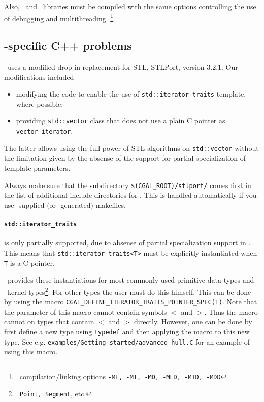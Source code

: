 Also, \leda\ and \cgal\ libraries must be compiled with the same
options controlling the use of debugging and multithreading.
\footnote{\msvc\ compilation/linking options 
\texttt{-ML, -MT, -MD, -MLD, -MTD, -MDD}}

\subsection{-specific C++ problems}


\cgal\ uses a modified drop-in replacement for STL, STLPort, 
version 3.2.1. Our modifications included 
\begin{itemize}
\item modifying the code to enable
the use of \texttt{std::iterator\_traits} template, where possible;
\item providing \texttt{std::vector} class that does not use
a plain C pointer as \texttt{vector\_iterator}.
\end{itemize}
The latter allows using the full power of STL algorithms on
\texttt{std::vector} without the limitation given by the absense
of the support for partial specialization of template parameters.

Always make sure that the subdirectory
\texttt{\$(CGAL\_ROOT)/stlport/} %
comes first in the list of additional include directories for \msvc.
This is handled automatically if you use \cgal-supplied (or \cgal-generated)
makefiles.


\paragraph{\texttt{std::iterator\_traits}} is only partially
supported, due to absense of partial specialization support in \msvc.
This means that \texttt{std::iterator\_traits<T>} must be explicitly
instantiated when \texttt{T} is a C pointer. 

\cgal\ provides
these instantiations for most commonly used primitive data types and
\cgal\ kernel types\footnote{\cgal\ \texttt{Point, Segment}, etc.}.
For other types the user must do this himself.  
This can be done by using the macro
\texttt{CGAL\_DEFINE\_ITERATOR\_TRAITS\_POINTER\_SPEC(T)}.
Note that the parameter of this macro cannot contain symbols $<$ and
$>$. Thus the macro cannot on types that contain $<$ and $>$
directly. However, one can be done by first define a new type using 
\texttt{typedef} and then applying the macro to this new type.
See e.g. \texttt{examples/Getting\_started/advanced\_hull.C}
for an example of using this macro.

